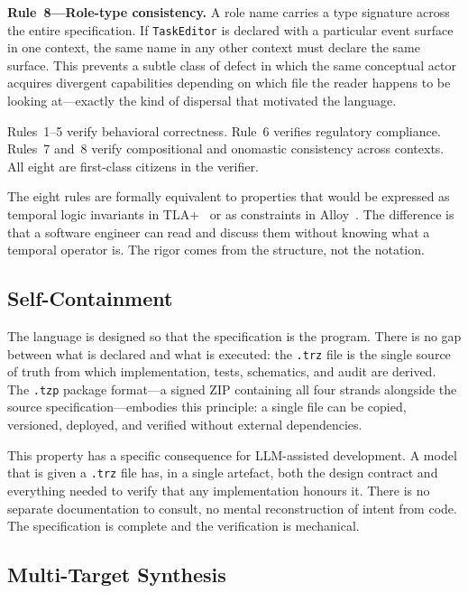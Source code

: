 \textbf{Rule~8---Role-type consistency.} A role name carries a type signature
across the entire specification. If \texttt{TaskEditor} is declared with a
particular event surface in one context, the same name in any other context
must declare the same surface. This prevents a subtle class of defect in which
the same conceptual actor acquires divergent capabilities depending on which
file the reader happens to be looking at---exactly the kind of dispersal that
motivated the language.

Rules~1--5 verify behavioral correctness. Rule~6 verifies regulatory
compliance. Rules~7 and~8 verify compositional and onomastic consistency
across contexts. All eight are first-class citizens in the verifier.

The eight rules are formally equivalent to properties that would be expressed
as temporal logic invariants in TLA+~\cite{lamport2002tla} or as constraints
in Alloy~\cite{jackson2006alloy}. The difference is that a software engineer
can read and discuss them without knowing what a temporal operator is. The
rigor comes from the structure, not the notation.

\subsection{Self-Containment}
\label{sec:selfcontain}

The language is designed so that the specification is the program. There is no
gap between what is declared and what is executed: the \texttt{.trz} file is
the single source of truth from which implementation, tests, schematics, and
audit are derived. The \texttt{.tzp} package format---a signed ZIP containing
all four strands alongside the source specification---embodies this principle:
a single file can be copied, versioned, deployed, and verified without external
dependencies.

This property has a specific consequence for LLM-assisted development. A model
that is given a \texttt{.trz} file has, in a single artefact, both the design
contract and everything needed to verify that any implementation honours it.
There is no separate documentation to consult, no mental reconstruction of
intent from code. The specification is complete and the verification is
mechanical.

\subsection{Multi-Target Synthesis}
\label{sec:multitarget}

